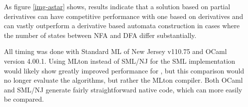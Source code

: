 As figure \ref{img-astar} shows, results indicate that a solution based on
partial derivatives can have competitive performance with one based on
derivatives and can vastly outperform a derivative based automata construction
in cases where the number of states between NFA and DFA differ substantially.

All timing was done with Standard ML of New Jersey v110.75 and OCaml version
4.00.1. Using MLton instead of SML/NJ for the SML implementation would likely
show greatly improved performance for \mlulex, but this comparison would no
longer evaluate the algorithms, but rather the MLton compiler. Both OCaml and
SML/NJ generate fairly straightforward native code, which can more easily be
compared.



